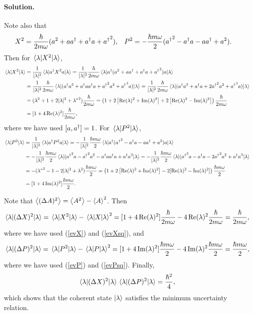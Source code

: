 \documentclass[11pt]{article}
\newcommand{\refeq}[1]{(\ref{#1})}
\newcommand{\beq}{\begin{equation*}}
\newcommand{\eeq}{\end{equation*}}
\newenvironment{solution}
{
    \paragraph{Solution.}
    \ignorespaces
}
{
}
\begin{document}
\begin{solution}
	Note also that
	\begin{align*}
		X^2 &= \frac{\hbar}{2 m \omega} (a^2 + a a^\dagger + a^\dagger a + {a^\dagger}^2), &
		P^2 &= -\frac{\hbar m \omega}{2} ({a^\dagger}^2 - a^\dagger a - a a^\dagger + a^2).
	\end{align*}
	Then for $\ev{X^2}{\lam}$,
	\begin{align}
		\ev{X^2}{\lam} &= \frac{1}{|\lam|^2} \ev{\ad X^2 a}{\lam}
		= \frac{1}{|\lam|^2} \frac{\hbar}{2 m \omega} \ev{\ad (a^2 + a \ad + \ad a + {\ad}^2) a}{\lam} \notag \\
		&= \frac{1}{|\lam|^2} \frac{\hbar}{2 m \omega} \ev{(\ad a^3 + \ad a \ad a + {\ad}^2 a^2 + {\ad}^3 a)}{\lam}
		= \frac{1}{|\lam|^2} \frac{\hbar}{2 m \omega} \ev{(\ad a^3 + \ad a + 2 {\ad}^2 a^2 + {\ad}^3 a)}{\lam} \notag \\
		&= (\lam^2 + 1 + 2 |\lam|^2 + {\lam^*}^2) \frac{\hbar}{2 m \omega}
		= \left( 1 + 2 \left[ \Re(\lam)^2 + \Im(\lam)^2 \right] + 2 \left[ \Re(\lam)^2 - \Im(\lam)^2 \right] \right) \frac{\hbar}{2 m \omega} \notag \\
		&= [1 + 4 \Re(\lam)^2 ] \frac{\hbar}{2 m \omega} \label{evXsq},
	\end{align}
	where we have used $[a, a^\dagger] = 1$.  For $\ev{P^2}{\lam}$,
	\begin{align}
		\ev{P^2}{\lam} &= \frac{1}{|\lam|^2} \ev{\ad P^2 a}{\lam}
		= -\frac{1}{|\lam|^2} \frac{\hbar m \omega}{2} \ev{\ad ({\ad}^2 - \ad a - a \ad + a^2) a}{\lam} \notag \\
		&= -\frac{1}{|\lam|^2} \frac{\hbar m \omega}{2} \ev{({\ad}^2 a - {\ad}^2 a^2 - \ad a \ad a + \ad a^3}{\lam}
		= -\frac{1}{|\lam|^2} \frac{\hbar m \omega}{2} \ev{({\ad}^3 a - \ad a - 2 {\ad}^2 a^2 + \ad a^3}{\lam} \notag \\
		&= -({\lam^*}^2 - 1 - 2 |\lam|^2 + \lam^2) \frac{\hbar m \omega}{2}
		= \left( 1 + 2 \left[ \Re(\lam)^2 + \Im(\lam)^2 \right] - 2 [\Re(\lam)^2 - \Im(\lam)^2] 
\right) \frac{\hbar m \omega}{2} \notag \\
		&= [1 + 4 \Im(\lam)^2] \frac{\hbar m \omega}{2}. \label{evPsq}
	\end{align}
	
	Note that $\ev{(\DA)^2} = \ev{A^2} - \ev{A}^2$.  Then
	\beq
		\ev{(\DX)^2}{\lam} = \ev{X^2}{\lam} - \ev{X}{\lam}^2 = [1 + 4 \Re(\lam)^2 ] \frac{\hbar}{2 m \omega} - 4 \Re(\lam)^2 \frac{\hbar}{2 m \omega} = \frac{\hbar}{2 m \omega},
	\eeq
	where we have used \refeq{evX} and \refeq{evXsq}, and
	\beq
		\ev{(\DP)^2}{\lam} = \ev{P^2}{\lam} - \ev{P}{\lam}^2 = [1 + 4 \Im(\lam)^2 ] \frac{\hbar m \omega}{2} - 4 \Im(\lam)^2 \frac{\hbar m \omega}{2} = \frac{\hbar m \omega}{2},
	\eeq
	where we have used \refeq{evP} and \refeq{evPsq}.  Finally,
	\beq
		\ev{(\DX)^2}{\lam} \ev{(\DP)^2}{\lam} = \frac{\hbar^2}{4},
	\eeq
	which shows that the coherent state $\ket{\lambda}$ satisfies the minimum uncertainty relation.
\end{solution}
\end{document}
